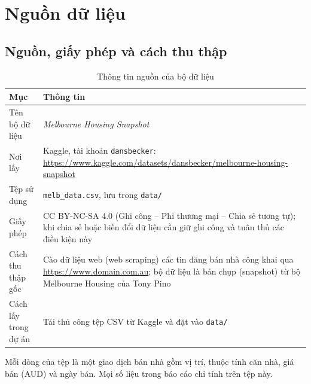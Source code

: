 \chapter{Nguồn dữ liệu}\label{ch:nguon}

\section{Nguồn, giấy phép và cách thu thập}\label{sec:nguon}
\begin{table}[H]
\centering
\caption{Thông tin nguồn của bộ dữ liệu}\label{tab:nguon}
\small
\begin{tabular}{@{}l L{10.2cm}@{}}
\toprule
Mục & Thông tin \\
\midrule
Tên bộ dữ liệu & \emph{Melbourne Housing Snapshot} \\
Nơi lấy & Kaggle, tài khoản \texttt{dansbecker}: \url{https://www.kaggle.com/datasets/dansbecker/melbourne-housing-snapshot} \\
Tệp sử dụng & \texttt{melb\_data.csv}, lưu trong \texttt{data/} \\
Giấy phép & CC BY-NC-SA 4.0 (Ghi công -- Phi thương mại -- Chia sẻ tương tự); khi chia sẻ hoặc biến đổi dữ liệu cần giữ ghi công và tuân thủ các điều kiện này \\
Cách thu thập gốc & Cào dữ liệu web (web scraping) các tin đăng bán nhà công khai qua \url{https://www.domain.com.au}; bộ dữ liệu là bản chụp (snapshot) từ bộ Melbourne Housing của Tony Pino \\
Cách lấy trong dự án & Tải thủ công tệp CSV từ Kaggle và đặt vào \texttt{data/} \\
\bottomrule
\end{tabular}
\end{table}

Mỗi dòng của tệp là một giao dịch bán nhà gồm vị trí, thuộc tính căn nhà, giá bán (AUD) và ngày bán. Mọi số liệu trong báo cáo chỉ tính trên tệp này.

